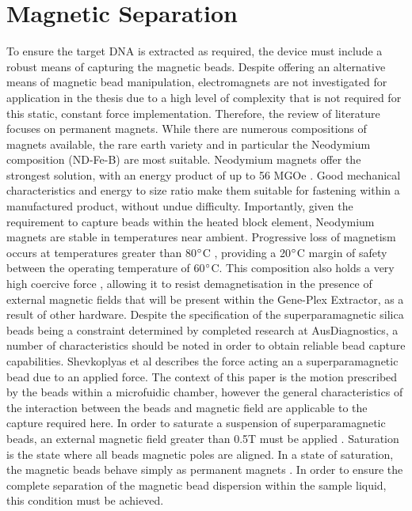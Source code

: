 \section{Magnetic Separation}
To ensure the target DNA is extracted as required, the device must include a robust means of capturing the magnetic beads. Despite offering an alternative means of magnetic bead manipulation, electromagnets are not investigated for application in the thesis due to a high level of complexity that is not required for this static, constant force implementation. Therefore, the review of literature focuses on permanent magnets. While there are numerous compositions of magnets available, the rare earth variety and in particular the Neodymium composition (ND-Fe-B) are most suitable. Neodymium magnets offer the strongest solution, with an energy product of up to 56 MGOe \cite{2006189852255}. Good mechanical characteristics and energy to size ratio make them suitable for fastening within a manufactured product, without undue difficulty. Importantly, given the requirement to capture beads within the heated block element, Neodymium magnets are stable in temperatures near ambient. Progressive loss of magnetism occurs at temperatures greater than 80$\degree$C \cite{2006189852255}, providing a 20$\degree$C margin of safety between the operating temperature of 60$\degree$C. This composition also holds a very high coercive force \cite{2006189852255}, allowing it to resist demagnetisation in the presence of external magnetic fields that will be present within the Gene-Plex Extractor, as a result of other hardware. Despite the specification of the superparamagnetic silica beads being a constraint determined by completed research at AusDiagnostics, a number of characteristics should be noted in order to obtain reliable bead capture capabilities. Shevkoplyas et al describes the force acting an a superparamagnetic bead due to an applied force. The context of this paper is the motion prescribed by the beads within a microfuidic chamber, however the general characteristics of the interaction between the beads and magnetic field are applicable to the capture required here. In order to saturate a suspension of superparamagnetic beads, an external magnetic field greater than 0.5T must be applied \cite{9774403}. Saturation is the state where all beads magnetic poles are aligned. In a state of saturation, the magnetic beads behave simply as permanent magnets \cite{9774403}\cite{8667402}. In order to ensure the complete separation of the magnetic bead dispersion within the sample liquid, this condition must be achieved.\\

